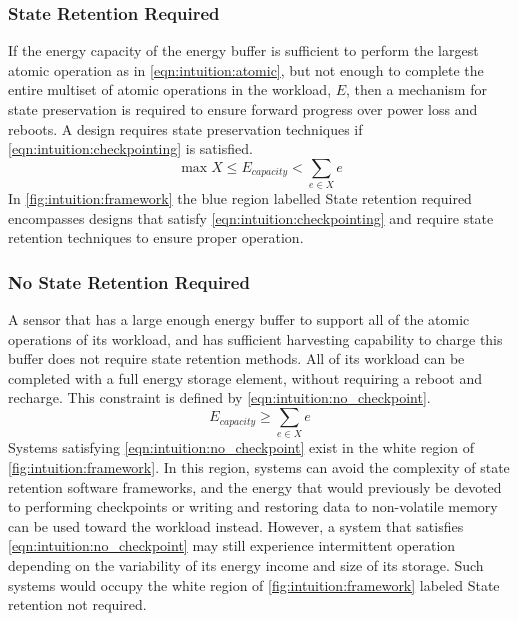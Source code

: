 \subsubsection{State Retention Required}
If the energy capacity of the energy buffer
is sufficient to perform the largest atomic operation as in \cref{eqn:intuition:atomic}, but
not enough to complete
the entire multiset of atomic operations in the workload, $E$,
then a mechanism for state preservation is required to ensure forward progress over power loss and reboots.
A design requires state preservation techniques if \cref{eqn:intuition:checkpointing} is satisfied.
\begin{equation}
    \label{eqn:intuition:checkpointing}
    \max X \leq E_{capacity} < \sum_{e \in X} e
\end{equation}
In \cref{fig:intuition:framework} the blue region labelled \textsf{State retention required} encompasses designs that satisfy \cref{eqn:intuition:checkpointing} and require state retention techniques to ensure proper operation.

\subsubsection{No State Retention Required}
A sensor that has a large enough energy buffer to support all of the atomic operations of its workload, and has sufficient harvesting capability to charge this buffer does not require state retention methods. All of its workload can be completed with a full energy storage element, without requiring a reboot and recharge.
This constraint is defined by \cref{eqn:intuition:no_checkpoint}.
\begin{equation}
    \label{eqn:intuition:no_checkpoint}
    E_{capacity} \geq \sum_{e \in X} e
\end{equation}
Systems satisfying \cref{eqn:intuition:no_checkpoint} exist in the white region of \cref{fig:intuition:framework}.
In this region, systems can avoid the complexity of state retention software frameworks, and the energy that would previously be devoted to performing checkpoints or writing and restoring data to non-volatile memory can be used toward the workload instead.
However, a system that satisfies \cref{eqn:intuition:no_checkpoint} may still experience intermittent operation depending on the variability of its energy income and size of its storage. Such systems would occupy the white region of \cref{fig:intuition:framework} labeled \textsf{State retention not required}.

